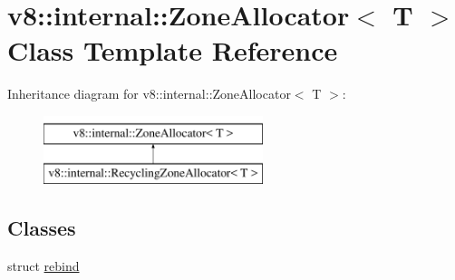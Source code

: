 \hypertarget{classv8_1_1internal_1_1ZoneAllocator}{}\section{v8\+:\+:internal\+:\+:Zone\+Allocator$<$ T $>$ Class Template Reference}
\label{classv8_1_1internal_1_1ZoneAllocator}
Inheritance diagram for v8\+:\+:internal\+:\+:Zone\+Allocator$<$ T $>$\+:\begin{figure}[H]
\begin{center}
\leavevmode
\includegraphics[height=2.000000cm]{classv8_1_1internal_1_1ZoneAllocator}
\end{center}
\end{figure}
\subsection*{Classes}
\begin{DoxyCompactItemize}
\item 
struct \mbox{\hyperlink{structv8_1_1internal_1_1ZoneAllocator_1_1rebind}{rebind}}
\end{DoxyCompactItemize}
